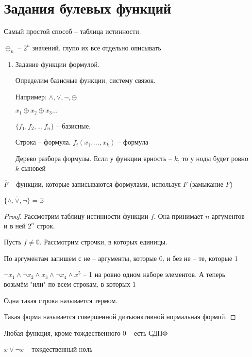 \documentclass{book}
\theoremstyle{definition}
\begin{document}
    \section{Задания булевых функций}

    Самый простой способ -- таблица истинности.

    $\oplus_n$ -- $2^n$ значений. глупо их все отдельно описывать

    \begin{enumerate}
        \item Задание функции формулой.

            Определим базисные функции, систему связок.

            Например: $\land, \vee, \neg, \oplus$

            $x_1 \oplus x_2 \oplus x_3 \ldots $

            $\{f_1, f_2, .., f_n\}$ -- базисные.

            Строка -- формула. $f_i(x_1, \ldots, x_k)$ -- формула

            \begin{definition}
                Дерево разбора формулы. Если у функции арность -- $k$, то у ноды будет ровно $k$ сыновей
            \end{definition}
    \end{enumerate}

    $\overline{F}$ --  функции, которые записываются формулами, используя $F$ (замыкание $F$)

    \begin{theorem}
         $\overline{\{\land, \vee, \neg\}} = \mathbb{B}$
    \end{theorem}
    \begin{proof}
        Рассмотрим таблицу истинности функции $f$. Она принимает $n$ аргументов и в ней $2^n$ строк.

        Пусть $f\neq \mathbb{0}$. Рассмотрим строчки, в которых единицы.

        По аргументам запишем с не -- аргументы, которые 0, и без не -- те, которые 1

        $\neg x_1 \land \neg x_2 \land x_3 \land \neg x_4 \land x^5$ -- 1 на ровно одном наборе элементов. А теперь возьмём "или" по всем строкам, в которых $1$ 

        Одна такая строка называется термом. 

        Такая форма называется совершенной дизъюнктивной нормальная формой.
    \end{proof}
    \begin{lemma}
        Любая функция, кроме тождественного 0  -- есть СДНФ

        $x\vee \neg x$ -- тождественный ноль
    \end{lemma}
\end{document}
